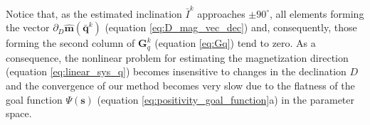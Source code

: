 Notice that, as the estimated inclination $\bar{I}^{k}$ approaches $\pm 90^{\circ}$, 
all elements forming the vector $\partial_{D} \hat{\mathbf{m}}(\bar{\mathbf{q}}^{k})$ 
(equation \ref{eq:D_mag_vec_dec}) and, consequently, those forming the second column of 
$\mathbf{G}_{q}^{k}$ (equation \ref{eq:Gq}) tend to zero. 
As a consequence, the nonlinear problem for estimating the magnetization direction 
(equation \ref{eq:linear_sys_q}) becomes insensitive to changes in the declination $D$ 
and the convergence of our method becomes very slow due to the flatness of the goal function 
$\Psi(\mathbf{s})$ (equation \ref{eq:positivity_goal_function}a) in the parameter space.

